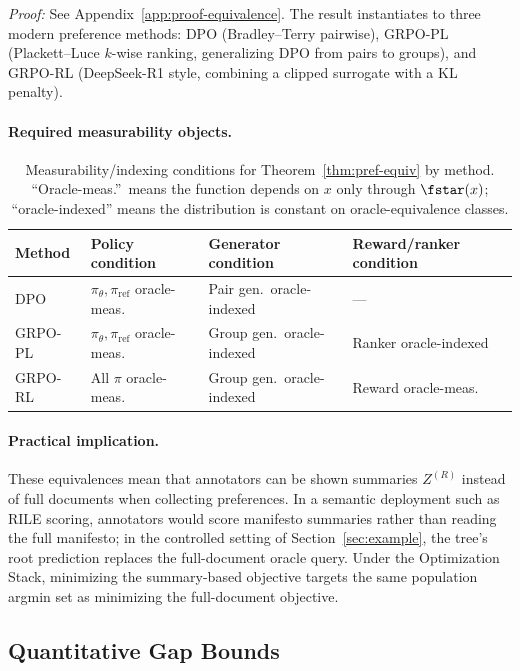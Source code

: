 \noindent\textit{Proof:} See Appendix~\ref{app:proof-equivalence}. The result instantiates to three modern preference methods: DPO (Bradley--Terry pairwise), GRPO-PL (Plackett--Luce $k$-wise ranking, generalizing DPO from pairs to groups), and GRPO-RL (DeepSeek-R1 style, combining a clipped surrogate with a KL penalty).

\paragraph{Required measurability objects.}
\begin{table}[t]
\centering\small
\begin{tabular}{llll}
\toprule
Method & Policy condition & Generator condition & Reward/ranker condition \\
\midrule
DPO & $\pi_\theta, \pi_{\mathrm{ref}}$ oracle-meas.\ & Pair gen.\ oracle-indexed & --- \\
GRPO-PL & $\pi_\theta, \pi_{\mathrm{ref}}$ oracle-meas.\ & Group gen.\ oracle-indexed & Ranker oracle-indexed \\
GRPO-RL & All $\pi$ oracle-meas.\ & Group gen.\ oracle-indexed & Reward oracle-meas.\ \\
\bottomrule
\end{tabular}
\caption{Measurability/indexing conditions for Theorem~\ref{thm:pref-equiv} by method. ``Oracle-meas.''\ means the function depends on $x$ only through $\fstar(x)$; ``oracle-indexed'' means the distribution is constant on oracle-equivalence classes.}
\label{tab:measurability}
\end{table}

\paragraph{Practical implication.}
These equivalences mean that annotators can be shown summaries $Z^{(R)}$ instead of full documents when collecting preferences. In a semantic deployment such as RILE scoring, annotators would score manifesto summaries rather than reading the full manifesto; in the controlled setting of Section~\ref{sec:example}, the tree's root prediction replaces the full-document oracle query. Under the Optimization Stack, minimizing the summary-based objective targets the same population argmin set as minimizing the full-document objective.

\subsection{Quantitative Gap Bounds}

